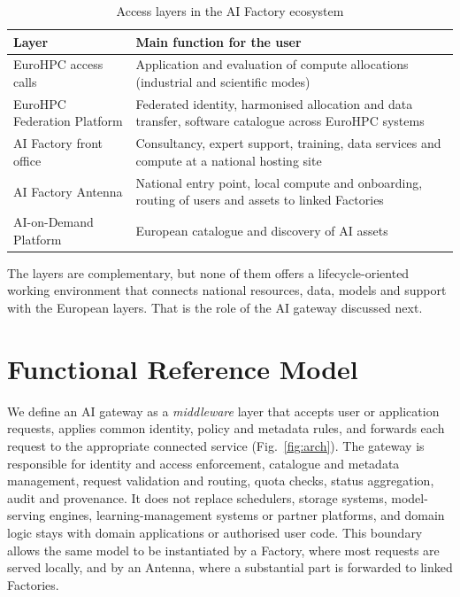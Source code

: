 \documentclass[conference,a4paper]{IEEEtran}
\begin{document}
\begin{table}[t]
\centering
\caption{Access layers in the AI Factory ecosystem}
\label{tab:landscape}
\footnotesize
\renewcommand{\arraystretch}{1.1}
\begin{tabular}{@{}p{2.25cm}p{5.75cm}@{}}
\toprule
\textbf{Layer} & \textbf{Main function for the user} \\
\midrule
EuroHPC access calls & Application and evaluation of compute allocations (industrial and scientific modes) \\
EuroHPC Federation Platform & Federated identity, harmonised allocation and data transfer, software catalogue across EuroHPC systems \\
AI Factory front office & Consultancy, expert support, training, data services and compute at a national hosting site \\
AI Factory Antenna & National entry point, local compute and onboarding, routing of users and assets to linked Factories \\
AI-on-Demand Platform & European catalogue and discovery of AI assets \\
\bottomrule
\end{tabular}
\end{table}

The layers are complementary, but none of them offers a lifecycle-oriented working environment that connects national resources, data, models and support with the European layers. That is the role of the AI gateway discussed next.

\section{Functional Reference Model}

We define an AI gateway as a \emph{middleware} layer that accepts user or application requests, applies common identity, policy and metadata rules, and forwards each request to the appropriate connected service (Fig.~\ref{fig:arch}). The gateway is responsible for identity and access enforcement, catalogue and metadata management, request validation and routing, quota checks, status aggregation, audit and provenance. It does not replace schedulers, storage systems, model-serving engines, learning-management systems or partner platforms, and domain logic stays with domain applications or authorised user code. This boundary allows the same model to be instantiated by a Factory, where most requests are served locally, and by an Antenna, where a substantial part is forwarded to linked Factories.
\end{document}

